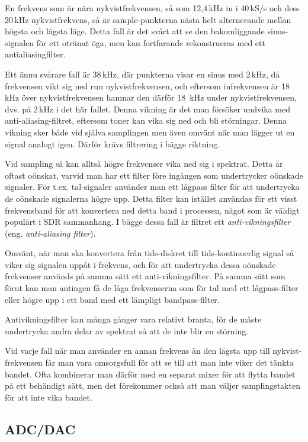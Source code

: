En frekvens som är nära nykvistfrekvensen, så som 12,4\,kHz in i 40\,kS/s och
dess 20\,kHz nykvistfrekvens, så är sample-punkterna nästa helt alternerande
mellan högsta och lägsta läge. Detta fall är det svårt att se den bakomliggande
sinus-signalen för ett otränat öga, men kan fortfarande rekonstrueras med ett
antialiasingfilter.

Ett ännu svårare fall är 38\,kHz, där punkterna visar en sinus med 2\,kHz, då
frekvensen vikt sig ned run nykvistfrekvensen, och eftersom infrekvensen är
18\,kHz över nykvistfrekvensen hamnar den därför 18~kHz under nykvistfrekvensen,
dvs. på 2\,kHz i det här fallet. Denna vikning är det man försöker undvika med
anti-aliasing-filtret, eftersom toner kan vika sig ned och bli störningar.
Denna vikning sker både vid själva samplingen men även omvänt när man lägger ut
en signal analogt igen. Därför krävs filtrering i bägge riktning.

Vid sampling så kan alltså högre frekvenser vika ned sig i spektrat.
Detta är oftast oönskat, varvid man har ett filter före ingången som
undertrycker oönskade signaler.
För t.ex. tal-signaler använder man ett lågpass filter för att undertrycka de
oönskade signalerna högre upp.
Detta filter kan istället användas för ett visst frekvensband för att
konvertera ned detta band i processen, något som är väldigt populärt i SDR
sammanhang.
I bägge dessa fall är filtret ett \emph{anti-vikningsfilter} (eng.
\emph{anti-aliasing filter}).

Omvänt, när man ska konvertera från tids-diskret till tids-kontinuerlig
signal så viker sig signalen uppåt i frekvens, och för att undertrycka dessa
oönskade frekvenser används på samma sätt ett anti-vikningsfilter.
På samma sätt som förut kan man antingen få de låga frekvenserna som för tal
med ett lågpass-filter eller högre upp i ett band med ett lämpligt
bandpass-filter.

Antivikningsfilter kan många gånger vara relativt branta, för de måste
undertrycka andra delar av spektrat så att de inte blir en störning.

Vid varje fall när man använder en annan frekvens än den lägsta upp till
nykvist-frekvensen får man vara omsorgsfull för att se till att man inte viker
det tänkta bandet.
Ofta kombinerar man därför med en separat mixer för att flytta bandet på ett
behändigt sätt, men det förekommer också att man väljer samplingstakten för att
inte vika bandet.

\subsection{ADC/DAC}

